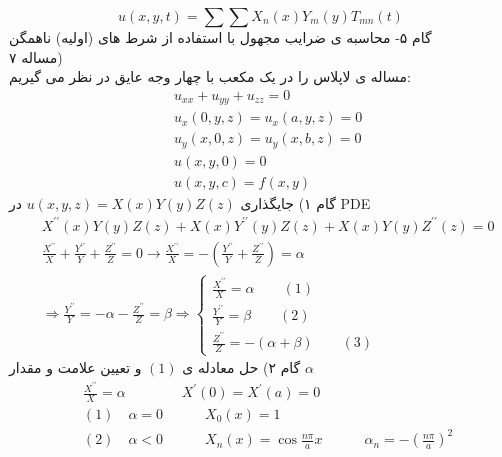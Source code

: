 \[u(x,y,t)=\sum\sum {X_n(x)Y_m(y)T_{mn}(t)}\]
گام ۵- محاسبه ی ضرایب مجهول با استفاده از شرط های (اولیه) ناهمگن\\
مساله ۷)\\
مساله ی لاپلاس را در یک مکعب با چهار وجه عایق در نظر می گیریم:
\begin{equation*}
	\begin{aligned}
		{} &\
		u_{xx}+u_{yy}+u_{zz}=0
		\\ &\
		u_{x}(0,y,z)=u_{x}(a,y,z)=0
		\\ &\
		u_{y}(x,0,z)=u_{y}(x,b,z)=0
		\\ &\
		u(x,y,0)=0
		\\ &\
		u(x,y,c)=f(x,y)
	\end{aligned}
\end{equation*}
گام ۱) جایگذاری 
$u(x,y,z)=X(x)Y(y)Z(z)$
در PDE
\begin{equation*}
	\begin{aligned}
		{} &\
		X^{\prime \prime}(x) Y(y) Z(z)+X(x) Y^{\prime \prime}(y) Z(z)+X(x) Y(y) Z^{\prime\prime}(z)=0
		\\ &\
		\frac{X^{\prime \prime}}{X}+\frac{Y^{\prime \prime}}{Y}+\frac{Z^{\prime \prime}}{Z}=0 \rightarrow \frac{X^{\prime \prime}}{X}=-\left(\frac{Y^{\prime \prime}}{Y}+\frac{Z^{\prime \prime}}{Z}\right)=\alpha
		\\ &\
		\Rightarrow\frac{Y^{\prime \prime}}{Y}=-\alpha-\frac{Z^{\prime \prime}}{Z}=\beta
		\Rightarrow\left\{\begin{array}{l}\frac{X^{\prime \prime}}{X}=\alpha \quad\quad (1) \\ \frac{Y^{\prime \prime}}{Y} = \beta  \quad\quad (2) \\ \frac{Z^{\prime \prime}}{Z} =-(\alpha+\beta)  \quad\quad (3)\end{array}\right.
	\end{aligned}
\end{equation*}
گام ۲) حل معادله ی
$(1)$
و تعیین علامت و مقدار
$\alpha$
\begin{equation*}
	\begin{aligned}
		{} &\
		\frac{X^{\prime \prime}}{X}=\alpha  \quad\quad \quad\quad X^{\prime}(0)=X^{\prime}(a)=0
		\\ &\
		(1) \quad \alpha=0  \quad\quad\quad X_{0}(x)=1
		\\ &\
		(2) \quad \alpha <0  \quad\quad\quad X_{n}(x)=\cos\frac{n \pi}{a}x \quad\quad\quad \alpha_{n}=-(\frac{n \pi}{a})^{2}
	\end{aligned}
\end{equation*}
